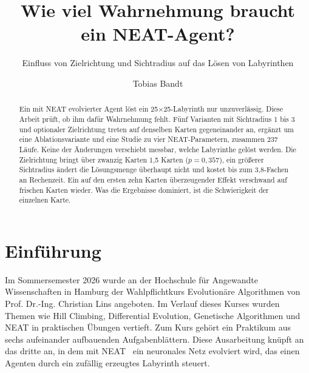 \documentclass[sigconf]{acmart}
\begin{document}
\title{Wie viel Wahrnehmung braucht ein NEAT-Agent?}
\subtitle{Einfluss von Zielrichtung und Sichtradius auf das Lösen von Labyrinthen}

\author{Tobias Bandt}

\renewcommand{\shortauthors}{Bandt}

\begin{abstract}
  Ein mit NEAT evolvierter Agent löst ein 25$\times$25-Labyrinth nur unzuverlässig. Diese Arbeit
  prüft, ob ihm dafür Wahrnehmung fehlt. Fünf Varianten mit Sichtradius 1 bis 3 und optionaler
  Zielrichtung treten auf denselben Karten gegeneinander an, ergänzt um eine Ablationsvariante
  und eine Studie zu vier NEAT-Parametern, zusammen 237 Läufe. Keine der Änderungen verschiebt
  messbar, welche Labyrinthe gelöst werden. Die Zielrichtung bringt über zwanzig Karten 1,5
  Karten ($p = 0{,}357$), ein größerer Sichtradius ändert die Lösungsmenge überhaupt nicht und
  kostet bis zum 3,8-Fachen an Rechenzeit. Ein auf den ersten zehn Karten überzeugender Effekt
  verschwand auf frischen Karten wieder. Was die Ergebnisse dominiert, ist die Schwierigkeit
  der einzelnen Karte.
\end{abstract}



\maketitle

\section{Einführung}
Im Sommersemester 2026 wurde an der Hochschule für Angewandte Wissenschaften in Hamburg der Wahlpflichtkurs Evolutionäre Algorithmen von Prof. Dr.-Ing. Christian Lins angeboten. Im Verlauf dieses Kurses wurden Themen wie Hill Climbing, Differential Evolution, Genetische Algorithmen und NEAT in praktischen Übungen vertieft. Zum Kurs gehört ein Praktikum aus sechs aufeinander aufbauenden Aufgabenblättern. Diese Ausarbeitung knüpft an das dritte an, in dem mit NEAT~\cite{stanley2002neat} ein neuronales Netz evolviert wird, das einen Agenten durch ein zufällig erzeugtes Labyrinth steuert.
\end{document}
